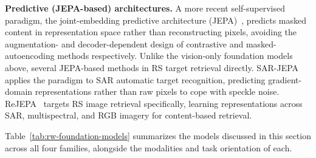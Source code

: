 \textbf{Predictive (JEPA-based) architectures.} A more recent self-supervised paradigm, the joint-embedding predictive architecture (JEPA)~\cite{assran2023jepa}, predicts masked content in representation space rather than reconstructing pixels, avoiding the augmentation- and decoder-dependent design of contrastive and masked-autoencoding methods respectively. Unlike the vision-only foundation models above, several JEPA-based methods in RS target retrieval directly. SAR-JEPA~\cite{li2023sarjepa} applies the paradigm to SAR automatic target recognition, predicting gradient-domain representations rather than raw pixels to cope with speckle noise. ReJEPA~\cite{choudhury2025rejepa} targets RS image retrieval specifically, learning representations across SAR, multispectral, and RGB imagery for content-based retrieval.

Table~\ref{tab:rw-foundation-models} summarizes the models discussed in this section across all four families, alongside the modalities and task orientation of each.

